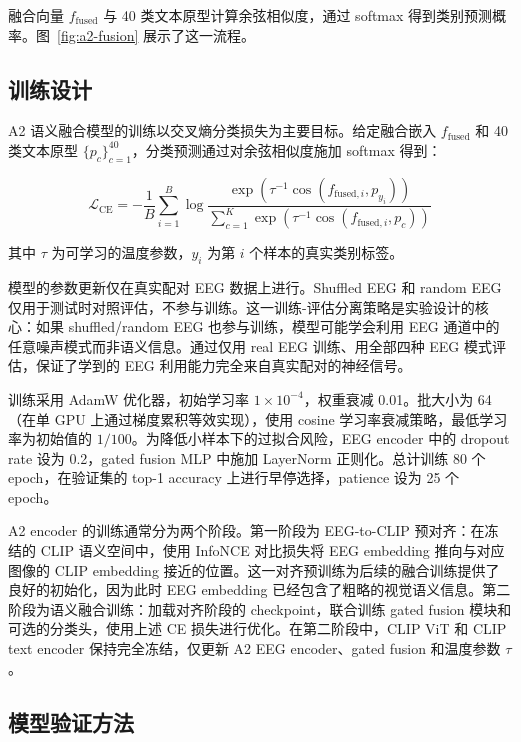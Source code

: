 融合向量 $f_{\mathrm{fused}}$ 与 40 类文本原型计算余弦相似度，通过 softmax 得到类别预测概率。图~\ref{fig:a2-fusion} 展示了这一流程。


\subsection{训练设计}

A2 语义融合模型的训练以交叉熵分类损失为主要目标。给定融合嵌入 $f_{\mathrm{fused}}$ 和 40 类文本原型 $\{p_c\}_{c=1}^{40}$，分类预测通过对余弦相似度施加 softmax 得到：

\begin{equation}
  \mathcal{L}_{\mathrm{CE}} = -\frac{1}{B} \sum_{i=1}^{B} \log \frac{\exp(\tau^{-1} \cos(f_{\mathrm{fused},i}, p_{y_i}))}{\sum_{c=1}^{K} \exp(\tau^{-1} \cos(f_{\mathrm{fused},i}, p_c))}
\end{equation}

其中 $\tau$ 为可学习的温度参数，$y_i$ 为第 $i$ 个样本的真实类别标签。

模型的参数更新仅在真实配对 EEG 数据上进行。Shuffled EEG 和 random EEG 仅用于测试时对照评估，不参与训练。这一训练-评估分离策略是实验设计的核心：如果 shuffled/random EEG 也参与训练，模型可能学会利用 EEG 通道中的任意噪声模式而非语义信息。通过仅用 real EEG 训练、用全部四种 EEG 模式评估，保证了学到的 EEG 利用能力完全来自真实配对的神经信号。

训练采用 AdamW 优化器，初始学习率 $1\times10^{-4}$，权重衰减 0.01。批大小为 64（在单 GPU 上通过梯度累积等效实现），使用 cosine 学习率衰减策略，最低学习率为初始值的 $1/100$。为降低小样本下的过拟合风险，EEG encoder 中的 dropout rate 设为 0.2，gated fusion MLP 中施加 LayerNorm 正则化。总计训练 80 个 epoch，在验证集的 top-1 accuracy 上进行早停选择，patience 设为 25 个 epoch。

A2 encoder 的训练通常分为两个阶段。第一阶段为 EEG-to-CLIP 预对齐：在冻结的 CLIP 语义空间中，使用 InfoNCE 对比损失将 EEG embedding 推向与对应图像的 CLIP embedding 接近的位置。这一对齐预训练为后续的融合训练提供了良好的初始化，因为此时 EEG embedding 已经包含了粗略的视觉语义信息。第二阶段为语义融合训练：加载对齐阶段的 checkpoint，联合训练 gated fusion 模块和可选的分类头，使用上述 CE 损失进行优化。在第二阶段中，CLIP ViT 和 CLIP text encoder 保持完全冻结，仅更新 A2 EEG encoder、gated fusion 和温度参数 $\tau$。

\subsection{模型验证方法}

